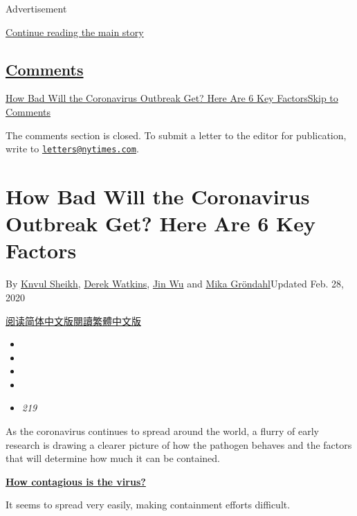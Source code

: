 Advertisement

\protect\hyperlink{after-top}{Continue reading the main story}

\hypertarget{comments}{%
\subsection{\texorpdfstring{\protect\hyperlink{commentsContainer}{Comments}}{Comments}}\label{comments}}

\href{}{How Bad Will the Coronavirus Outbreak Get? Here Are 6 Key
Factors}\href{}{Skip to Comments}

The comments section is closed. To submit a letter to the editor for
publication, write to
\href{mailto:letters@nytimes.com}{\nolinkurl{letters@nytimes.com}}.

\hypertarget{how-bad-will-the-coronavirus-outbreak-get-here-are-6-key-factors}{%
\section{How Bad Will the Coronavirus Outbreak Get? Here Are 6 Key
Factors}\label{how-bad-will-the-coronavirus-outbreak-get-here-are-6-key-factors}}

By \href{https://www.nytimes.com/by/knvul-sheikh}{Knvul Sheikh},
\href{https://www.nytimes.com/by/derek-watkins}{Derek Watkins},
\href{https://www.nytimes.com/by/jin-wu}{Jin Wu} and
\href{https://www.nytimes.com/by/mika-grondahl}{Mika Gröndahl}Updated
Feb. 28, 2020

\href{https://cn.nytimes.com/china/20200201/china-coronavirus-contain/}{阅读简体中文版}\href{https://cn.nytimes.com/china/20200201/china-coronavirus-contain/zh-hant/}{閱讀繁體中文版}

\begin{itemize}
\item
\item
\item
\item
\item
  \emph{219}
\end{itemize}

As the coronavirus continues to spread around the world, a flurry of
early research is drawing a clearer picture of how the pathogen behaves
and the factors that will determine how much it can be contained.

\protect\hyperlink{transmission}{\textbf{How contagious is the virus?}}

It seems to spread very easily, making containment efforts difficult.

